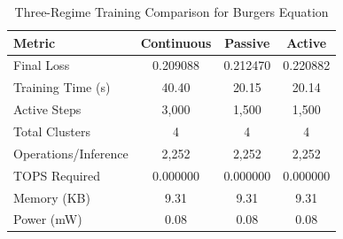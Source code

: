 \begin{table}[htbp]
\centering
\caption{Three-Regime Training Comparison for Burgers Equation}
\label{tab:three_regime_comparison}
\begin{tabular}{l|ccc}
\hline
\textbf{Metric} & \textbf{Continuous} & \textbf{Passive} & \textbf{Active} \\
\hline
Final Loss & 0.209088 & 0.212470 & 0.220882 \\
Training Time (s) & 40.40 & 20.15 & 20.14 \\
Active Steps & 3,000 & 1,500 & 1,500 \\
Total Clusters & 4 & 4 & 4 \\
Operations/Inference & 2,252 & 2,252 & 2,252 \\
TOPS Required & 0.000000 & 0.000000 & 0.000000 \\
Memory (KB) & 9.31 & 9.31 & 9.31 \\
Power (mW) & 0.08 & 0.08 & 0.08 \\
\hline
\end{tabular}
\end{table}

